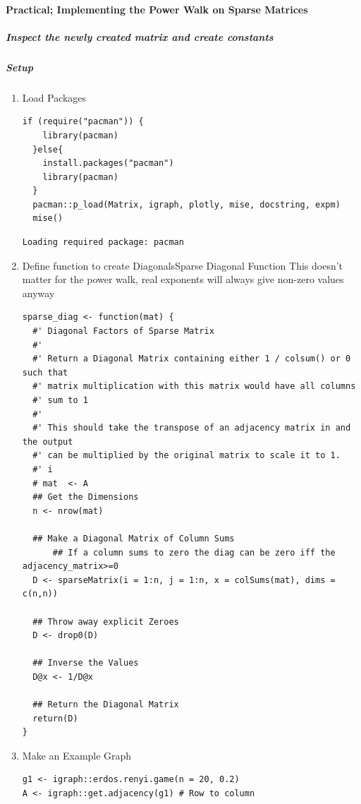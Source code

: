 \documentclass[11pt]{article}
\begin{document}
\paragraph{Practical; Implementing the Power Walk on Sparse Matrices}
\label{sec:org0e119f8}
\subparagraph{Inspect the newly created matrix and create constants}
\label{sec:orge63ca61}
\subparagraph{Setup}
\label{sec:org0447a17}
\begin{enumerate}
\item Load Packages
\label{sec:orge323aa3}
\begin{verbatim}
if (require("pacman")) {
    library(pacman)
  }else{
    install.packages("pacman")
    library(pacman)
  }
  pacman::p_load(Matrix, igraph, plotly, mise, docstring, expm)
  mise()
\end{verbatim}

\begin{verbatim}
Loading required package: pacman
\end{verbatim}

\item Define function to create DiagonalsSparse Diagonal Function
\label{sec:org5dfeee9}
This doesn't matter for the power walk, real exponents will always give non-zero values anyway
\begin{verbatim}
sparse_diag <- function(mat) {
  #' Diagonal Factors of Sparse Matrix
  #'
  #' Return a Diagonal Matrix containing either 1 / colsum() or 0 such that
  #' matrix multiplication with this matrix would have all columns
  #' sum to 1
  #'
  #' This should take the transpose of an adjacency matrix in and the output
  #' can be multiplied by the original matrix to scale it to 1.
  #' i
  # mat  <- A
  ## Get the Dimensions
  n <- nrow(mat)

  ## Make a Diagonal Matrix of Column Sums
      ## If a column sums to zero the diag can be zero iff the adjacency_matrix>=0
  D <- sparseMatrix(i = 1:n, j = 1:n, x = colSums(mat), dims = c(n,n))

  ## Throw away explicit Zeroes
  D <- drop0(D)

  ## Inverse the Values
  D@x <- 1/D@x

  ## Return the Diagonal Matrix
  return(D)
}
\end{verbatim}

\item Make an Example Graph
\label{sec:org93f7128}
\begin{verbatim}
g1 <- igraph::erdos.renyi.game(n = 20, 0.2)
A <- igraph::get.adjacency(g1) # Row to column



\end{verbatim}
\end{enumerate}
\end{document}
